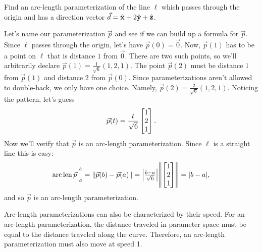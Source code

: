 \begin{example}
	Find an arc-length parameterization of the line $\ell$ which passes through
	the origin and has a direction vector $\vec d={\hat {\mathbf x}}+2{\hat {\mathbf y}}+{\hat {\mathbf z}}$.

	Let's name our parameterization $\vec p$ and see if we can build up
	a formula for $\vec p$.
	Since $\ell$ passes through the origin, let's have $\vec p(0)=\vec 0$.
	Now, $\vec p(1)$ has to be a point on $\ell$ that is distance $1$ from $\vec 0$.
	There are two such points, so we'll arbitrarily declare
	$
		\vec p(1) = \frac{1}{\sqrt{6}}(1,2,1).
	$
	The point $\vec p(2)$ must be distance $1$ from $\vec p(1)$ and distance $2$ from $\vec p(0)$.
	Since parameterizations aren't allowed to double-back, we only have one choice.  Namely,
	$
		\vec p(2) = \frac{2}{\sqrt{6}}(1,2,1).
	$
	Noticing the pattern, let's guess
	\[
		\vec p(t) = \frac{t}{\sqrt{6}}\mat{1\\2\\1}.
	\]
	Now we'll verify that $\vec p$ is an arc-length parameterization.  Since $\ell$ is
	a straight line this is easy:
	\[
		\Arclenfrom{\vec p}{a}{b}=\norm{\vec p(b)-\vec p(a)} = \abs*{\tfrac{b-a}{\sqrt{6}}}\norm*{\mat{1\\2\\1}}
		=\abs{b-a},
	\]
	and so $\vec p$ is an arc-length parameterization.
\end{example}

Arc-length parameterizations can also be characterized by their speed.  For an arc-length
parameterization, the distance traveled in parameter space must be equal to the distance
traveled along the curve.  Therefore, an arc-length parameterization must also move at
speed 1.

